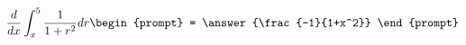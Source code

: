 \documentclass{ximera}
\author{Steven Gubkin}
\begin{document}
\begin{exercise}

\[
\frac{d}{dx} \int_x^{5} \frac{1}{1+r^2} dr \begin{prompt} = \answer{\frac{-1}{1+x^2}} \end{prompt}
\]

\end{exercise}
\end{document}
